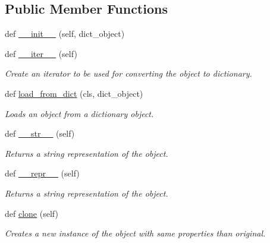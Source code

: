 \subsection*{Public Member Functions}
\begin{DoxyCompactItemize}
\item 
def \hyperlink{classsylva_1_1base_1_1sylva__base_1_1_s_y_l_v_a_base_a5692ae87ad4953fdfe317953fcf530f8}{\+\_\+\+\_\+init\+\_\+\+\_\+} (self, dict\+\_\+object)
\item 
def \hyperlink{classsylva_1_1base_1_1sylva__base_1_1_s_y_l_v_a_base_a8dc04df3b843a1deb6e1ae13f8425783}{\+\_\+\+\_\+iter\+\_\+\+\_\+} (self)
\begin{DoxyCompactList}\small\item\em Create an iterator to be used for converting the object to dictionary. \end{DoxyCompactList}\item 
def \hyperlink{classsylva_1_1base_1_1sylva__base_1_1_s_y_l_v_a_base_a4acd68307f4b2bef6082b86f3ff6ce3a}{load\+\_\+from\+\_\+dict} (cls, dict\+\_\+object)
\begin{DoxyCompactList}\small\item\em Loads an object from a dictionary object. \end{DoxyCompactList}\item 
def \hyperlink{classsylva_1_1base_1_1sylva__base_1_1_s_y_l_v_a_base_a6c1ed8e83c61ea8a6035b5e4460989f3}{\+\_\+\+\_\+str\+\_\+\+\_\+} (self)
\begin{DoxyCompactList}\small\item\em Returns a string representation of the object. \end{DoxyCompactList}\item 
def \hyperlink{classsylva_1_1base_1_1sylva__base_1_1_s_y_l_v_a_base_a5bd08c41ab09c380433d0de82fb98860}{\+\_\+\+\_\+repr\+\_\+\+\_\+} (self)
\begin{DoxyCompactList}\small\item\em Returns a string representation of the object. \end{DoxyCompactList}\item 
def \hyperlink{classsylva_1_1base_1_1sylva__base_1_1_s_y_l_v_a_base_a1597b4594cb73e0fa2597742239660f5}{clone} (self)
\begin{DoxyCompactList}\small\item\em Creates a new instance of the object with same properties than original. \end{DoxyCompactList}\end{DoxyCompactItemize}


